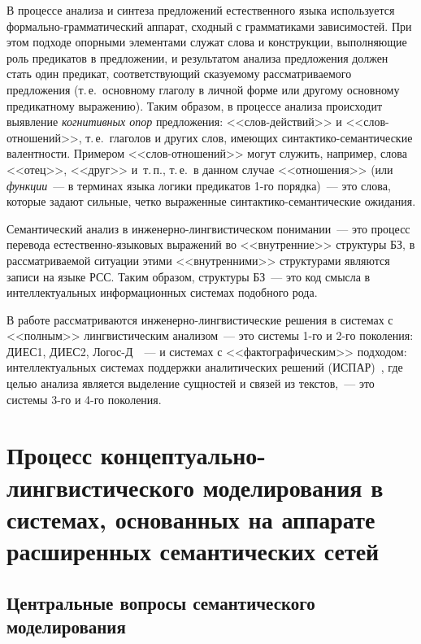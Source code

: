 \begin{multicols}{2}
     В процессе анализа и синтеза предложений естественного языка 
используется фор\-маль\-но-грам\-ма\-ти\-че\-ский аппарат, сходный с 
грамматиками зависимостей. При этом подходе опорными элементами 
служат слова и конструкции, выполняющие роль предикатов в предложении, 
и результатом анализа предложения должен стать один предикат, 
соответствующий сказуемому рассматриваемого предложения (т.\,е.\ 
основному глаголу в личной форме или другому основному предикатному 
выражению). Таким образом, в процессе анализа происходит выявление 
\textit{когнитивных опор} предложения: <<слов-дейст\-вий>> и 
     <<слов-от\-но\-ше\-ний>>, т.\,е.\ глаголов и других слов, имеющих 
синтактико-семантические валентности. Примером <<слов-от\-но\-ше\-ний>> 
могут служить, например, слова <<отец>>, <<друг>> и~т.\,п., т.\,е.\ в данном 
случае <<отношения>> (или \textit{функции}~--- в терминах языка логики 
предикатов 1-го порядка)~--- это слова, которые задают сильные, четко 
выраженные син\-так\-ти\-ко-се\-ман\-ти\-че\-ские ожидания. 
     
     Семантический анализ в ин\-же\-нер\-но-линг\-ви\-сти\-че\-ском 
понимании~--- это процесс перевода ес\-тест\-вен\-но-язы\-ко\-вых 
выражений во <<внутренние>> структуры БЗ, в 
рассматриваемой ситуации этими <<внутренними>> структурами являются 
записи на языке РСС. Таким образом, структуры БЗ~--- это код смысла в 
интеллектуальных информационных системах подобного рода. 
     
     В работе рассматриваются ин\-же\-нер\-но-линг\-ви\-сти\-че\-ские 
решения в системах с <<пол\-ным>> линг\-ви\-сти\-че\-ским анализом~--- это 
     сис\-те\-мы 1-го и 2-го поколения: ДИЕС1, ДИЕС2, 
     Логос-Д~\cite{2koz, 3koz}~--- и сис\-те\-мах с <<фактографическим>> 
подходом: интеллектуальных системах поддержки аналитических решений 
(ИСПАР)~\cite{18koz, 19koz}, где целью анализа является выделение 
сущностей и связей из текстов,~--- это системы 3-го и 4-го поколения. 

\section{Процесс концептуально-лингвистического моделирования 
в системах, основанных на аппарате расширенных семантических сетей}
     
\subsection{Центральные вопросы семантического моделирования} %
     

\end{multicols}
